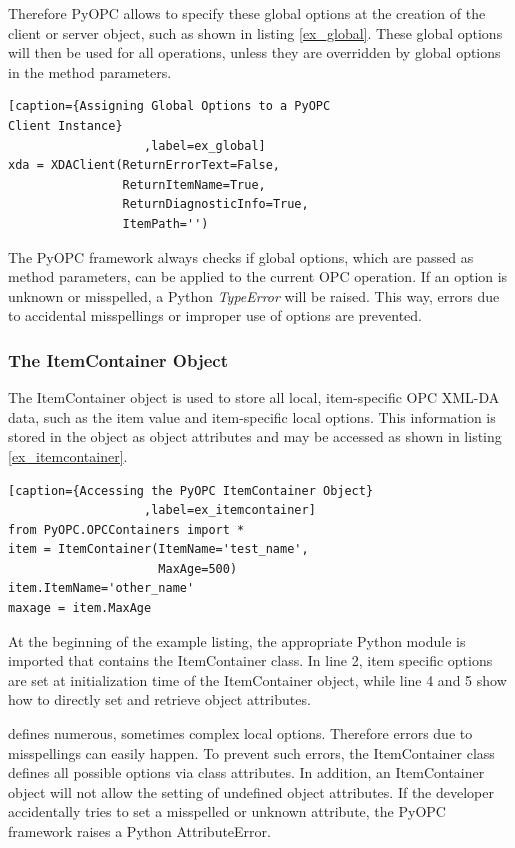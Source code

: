 Therefore PyOPC allows to specify these global options at the creation
of the client or server object, such as shown in listing \ref{ex_global}.
These global options will then be used for all operations, unless they
are overridden by global options in the method parameters.

\lstset{language=C}
\begin{lstlisting}[caption={Assigning Global Options to a PyOPC 
Client Instance}
                   ,label=ex_global]
xda = XDAClient(ReturnErrorText=False,
                ReturnItemName=True,
                ReturnDiagnosticInfo=True,
                ItemPath='')
\end{lstlisting}

The PyOPC framework always checks if global options, which are passed
as method parameters, can be applied to the current OPC operation. If
an option is unknown or misspelled, a Python {\sl TypeError} will be
raised. This way, errors due to accidental misspellings or improper
use of options are prevented.

\subsubsection*{The ItemContainer Object}

The ItemContainer object is used to store all local, item-specific OPC
XML-DA data, such as the item value and item-specific local
options. This information is stored in the object as object attributes
and may be accessed as shown in listing \ref{ex_itemcontainer}.


\lstset{language=C}
\begin{lstlisting}[caption={Accessing the PyOPC ItemContainer Object}
                   ,label=ex_itemcontainer] 
from PyOPC.OPCContainers import *
item = ItemContainer(ItemName='test_name',
                     MaxAge=500)
item.ItemName='other_name'
maxage = item.MaxAge
\end{lstlisting}

At the beginning of the example listing, the appropriate Python module
is imported that contains the ItemContainer class. In line 2, item
specific options are set at initialization time of the ItemContainer
object, while line 4 and 5 show how to directly set and retrieve
object attributes.

\cite{OPCXMLDA} defines numerous, sometimes complex local
options. Therefore errors due to misspellings can easily happen. To
prevent such errors, the ItemContainer class defines all possible
options via class attributes. In addition, an ItemContainer object
will not allow the setting of undefined object attributes. If the
developer accidentally tries to set a misspelled or unknown attribute,
the PyOPC framework raises a Python AttributeError.

